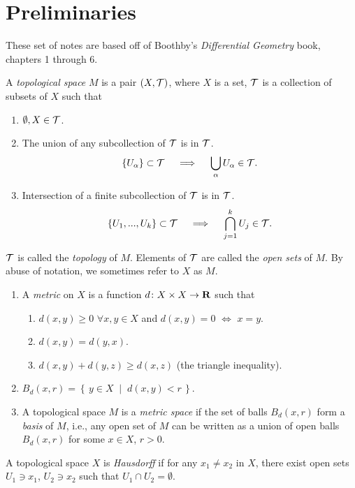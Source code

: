 \chapter{Preliminaries}
These set of notes are based off of Boothby's \emph{Differential Geometry}
book, chapters 1 through 6.
\begin{definition}
A \emph{topological space} $M$ is a pair $(X,\mathcal{T})$, where $X$ is a set,
$\mathcal{T}$ is a collection of subsets of $X$ such that
\begin{enumerate}[label=(\alph*)]
\item $\emptyset,X\in\mathcal{T}$.
\item The union of any subcollection of $\mathcal{T}$ is in $\mathcal{T}$.
\[
\left\{U_\alpha\right\}\subset\mathcal{T}
\quad\implies\quad
\bigcup_\alpha U_\alpha\in\mathcal{T}.\]
\item Intersection of a finite subcollection of $\mathcal{T}$ is in $\mathcal{T}$.
\[\left\{U_1,...,U_k\right\}\subset\mathcal{T}
\quad\implies\quad
\bigcap_{j=1}^k U_j\in\mathcal{T}.\]
\end{enumerate}
$\mathcal{T}$ is called the \emph{topology} of $M$. Elements of $\mathcal{T}$ are
called the \emph{open sets} of $M$. By abuse of notation, we sometimes
refer to $X$ as $M$.
\end{definition}
\begin{definition}
\begin{enumerate}[label=(\alph*)]
\item A \emph{metric} on $X$ is a function $d\colon X\times X\to\mathbf{R}$ such
  that
  \begin{enumerate}[label=(\arabic*)]
  \item $d(x,y)\geq 0$ $\forall x,y\in X$ and $d(x,y)=0$ $\iff$ $x=y$.
  \item $d(x,y)=d(y,x)$.
  \item $d(x,y)+d(y,z)\geq d(x,z)$ (the triangle inequality).
  \end{enumerate}
\item $B_d(x,r)=\left\{\,y\in X\;\middle|\;d(x,y)<r\,\right\}$.
\item A topological space $M$ is a \emph{metric space} if the set of balls
  $B_d(x,r)$ form a \emph{basis} of $M$, i.e., any open set of $M$ can be
  written as a union of open balls $B_d(x,r)$ for some $x\in X$, $r>0$.
\end{enumerate}
\end{definition}

\begin{definition}
A topological space $X$ is \emph{Hausdorff} if for any $x_1\neq x_2$ in
$X$, there exist open sets $U_1\ni x_1$, $U_2\ni x_2$ such that $U_1\cap
U_2=\emptyset$.
\end{definition}

